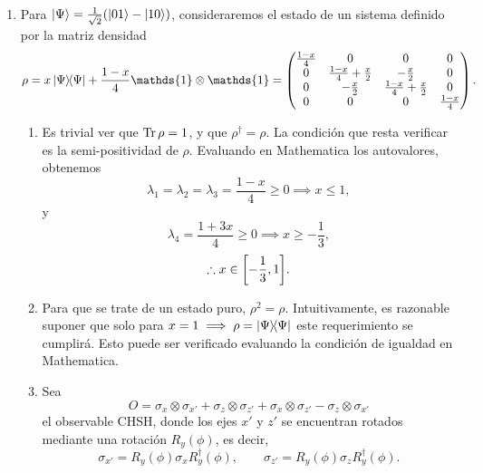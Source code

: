 \documentclass{scrartcl}
\newcommand{\inv}[1]{\frac{1}{#1}}
\DeclareRobustCommand{\[}{\begin{equation}}
\DeclareRobustCommand{\]}{\end{equation}}
\begin{document}
\begin{enumerate}
\begin{enumerate}
\begin{enumerate}[(i)]
        \end{enumerate}
    
    \end{enumerate}
    
    
    
    \item Para $\ket{\Psi} = \inv{\sqrt{2}} (\ket{01} - \ket{10})$, consideraremos el estado de un sistema definido por la matriz densidad
    \[
        \rho = x \dyad{\Psi}{\Psi} + \frac{1-x}{4} \mathds{1} \otimes \mathds{1} =
        \begin{pmatrix}
            \frac{1-x}{4} & 0 & 0 & 0 \\
            0 & \frac{1-x}{4} + \frac{x}{2} & -\frac{x}{2} & 0 \\
            0 & -\frac{x}{2} & \frac{1-x}{4} + \frac{x}{2} & 0 \\
            0 & 0 & 0 & \frac{1-x}{4}
        \end{pmatrix}.
    \]
    
    \begin{enumerate}
        \item Es trivial ver que $\Tr \rho = 1$, y que $\rho^\dagger = \rho$. La condición que resta verificar es la semi-positividad de $\rho$. Evaluando en Mathematica los autovalores, obtenemos
        \[ \lambda_1 = \lambda_2 = \lambda_3 = \frac{1-x}{4} \geq 0 \implies x \leq 1, \]
        y
        \[ \lambda_4 = \frac{1 + 3x}{4} \geq 0 \implies x \geq -\frac{1}{3}, \]
        \[ \therefore x \in \qty[-\frac{1}{3}, 1]. \]
        
        
        \item Para que se trate de un estado puro, $\rho^2 = \rho$. Intuitivamente, es razonable suponer que solo para $x = 1 \implies \rho = \dyad{\Psi}{\Psi}$ este requerimiento se cumplirá. Esto puede ser verificado evaluando la condición de igualdad en Mathematica.
        
        
        \item Sea
        \[ O = \sigma_x \otimes \sigma_{x'} + \sigma_z \otimes \sigma_{z'} + \sigma_x \otimes \sigma_{z'} - \sigma_z \otimes \sigma_{x'} \]
        el observable CHSH, donde los ejes $x'$ y $z'$ se encuentran rotados mediante una rotación $R_y(\phi)$, es decir,
        \[ \sigma_{x'} = R_y(\phi) \sigma_x R^\dagger_y(\phi), \quad \quad \sigma_{z'} = R_y(\phi) \sigma_z R^\dagger_y(\phi). \]
        

\end{enumerate}
\end{enumerate}
\end{document}
